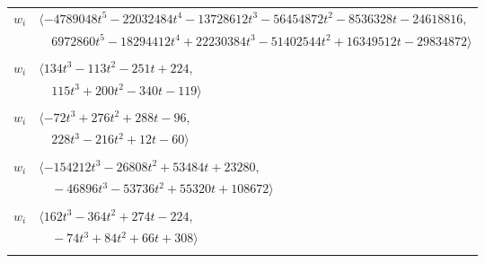 \documentclass[11pt]{article}
\begin{document}
\begin{longtable}{@{}ll@{}}
$w_i$ & $\langle -4789048t^{5}-22032484t^{4}-13728612t^{3}-56454872t^{2}-8536328t-24618816,$\\
 & $\quad 6972860t^{5}-18294412t^{4}+22230384t^{3}-51402544t^{2}+16349512t-29834872\rangle$\\
\addlinespace[2pt]
\multicolumn{2}{@{}p{0.97\textwidth}@{}}{$i=62$, $D_i=1$, $\rho_{ij}$: $3{:}2, \allowbreak 6{:}2, \allowbreak 13{:}1, \allowbreak 16{:}2, \allowbreak 17{:}1, \allowbreak 18{:}2, \allowbreak 20{:}1, \allowbreak 22{:}2, \allowbreak 37{:}2, \allowbreak 51{:}1, \allowbreak 56{:}1, \allowbreak 64{:}1$}\\
$w_i$ & $\langle 134t^{3}-113t^{2}-251t+224,$\\
 & $\quad 115t^{3}+200t^{2}-340t-119\rangle$\\
\addlinespace[2pt]
\multicolumn{2}{@{}p{0.97\textwidth}@{}}{$i=63$, $D_i=1$, $\rho_{ij}$: $0{:}2, \allowbreak 1{:}1, \allowbreak 6{:}1, \allowbreak 14{:}2, \allowbreak 18{:}2, \allowbreak 23{:}1, \allowbreak 36{:}2, \allowbreak 55{:}2, \allowbreak 61{:}1, \allowbreak 76{:}2, \allowbreak 82{:}2$}\\
$w_i$ & $\langle -72t^{3}+276t^{2}+288t-96,$\\
 & $\quad 228t^{3}-216t^{2}+12t-60\rangle$\\
\addlinespace[2pt]
\multicolumn{2}{@{}p{0.97\textwidth}@{}}{$i=64$, $D_i=1$, $\rho_{ij}$: $1{:}1, \allowbreak 4{:}1, \allowbreak 5{:}1, \allowbreak 10{:}1, \allowbreak 14{:}1, \allowbreak 18{:}2, \allowbreak 22{:}2, \allowbreak 27{:}2, \allowbreak 33{:}1, \allowbreak 41{:}2, \allowbreak 47{:}1, \allowbreak 50{:}2, \allowbreak 61{:}2, \allowbreak 62{:}2$}\\
$w_i$ & $\langle -154212t^{3}-26808t^{2}+53484t+23280,$\\
 & $\quad -46896t^{3}-53736t^{2}+55320t+108672\rangle$\\
\addlinespace[2pt]
\multicolumn{2}{@{}p{0.97\textwidth}@{}}{$i=65$, $D_i=1$, $\rho_{ij}$: $0{:}1, \allowbreak 11{:}1, \allowbreak 16{:}1, \allowbreak 17{:}1, \allowbreak 27{:}1, \allowbreak 34{:}1, \allowbreak 37{:}1, \allowbreak 39{:}1, \allowbreak 55{:}2, \allowbreak 61{:}1, \allowbreak 67{:}1, \allowbreak 71{:}1, \allowbreak 75{:}1, \allowbreak 82{:}2, \allowbreak 93{:}1, \allowbreak 96{:}2$}\\
$w_i$ & $\langle 162t^{3}-364t^{2}+274t-224,$\\
 & $\quad -74t^{3}+84t^{2}+66t+308\rangle$\\
\addlinespace[2pt]
\multicolumn{2}{@{}p{0.97\textwidth}@{}}{$i=66$, $D_i=1$, $\rho_{ij}$: $--$}\\

\end{longtable}
\end{document}
